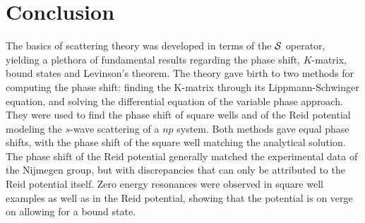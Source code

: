\section{Conclusion}\label{sec:Conclusion}

The basics of scattering theory was developed in terms of the \(\mathcal{S}\)
operator, yielding a plethora of fundamental results regarding the phase shift,
\(K\)-matrix, bound states and Levinson's theorem. The theory gave birth to two
methods for computing the phase shift: finding the K-matrix through its
Lippmann-Schwinger equation, and solving the differential equation of the
variable phase approach. They were used to find the phase shift of square wells
and of the Reid potential modeling the \(s\)-wave scattering of a \(np\) system.
Both methods gave equal phase shifts, with the phase shift of the square well
matching the analytical solution. The phase shift of the Reid potential
generally matched the experimental data of the Nijmegen group, but with
discrepancies that can only be attributed to the Reid potential itself. Zero
energy resonances were observed in square well examples as well as in the Reid
potential, showing that the potential is on verge on allowing for a bound state.

